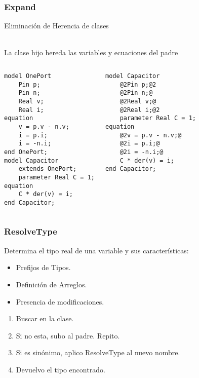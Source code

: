 \begin{frame}[fragile]
\frametitle{Expand} 
\begin{huge}
Eliminación de Herencia de clases
\end{huge} \\
La clase hijo hereda las variables y ecuaciones del padre
 
\pause 
\begin{columns} 
\begin{lstlisting}[style=base,basicstyle=\scriptsize]
model OnePort
    Pin p;
    Pin n;
    Real v;
    Real i;
equation
    v = p.v - n.v;
    i = p.i;
    i = -n.i;
end OnePort;
model Capacitor
    extends OnePort;
    parameter Real C = 1;
equation
    C * der(v) = i;
end Capacitor;
\end{lstlisting} 
\pause
{}  
\begin{lstlisting}[style=base,basicstyle=\scriptsize]
model Capacitor 
    @2Pin p;@2
    @2Pin n;@
    @2Real v;@
    @2Real i;@2
    parameter Real C = 1;
equation
    @2v = p.v - n.v;@
    @2i = p.i;@
    @2i = -n.i;@
    C * der(v) = i;
end Capacitor;
\end{lstlisting}
\end{columns}
\end{frame}



\begin{frame}[fragile]
\frametitle{ResolveType} 
Determina el tipo real de una variable y sus características: 
\begin{itemize}
    \item Prefijos de Tipos.
    \item Definición de Arreglos. 
    \item Presencia de modificaciones.
\end{itemize}

\begin{enumerate}
\item Buscar en la clase.
\item Si no esta, subo al padre. Repito.
\item Si es sinónimo, aplico ResolveType al nuevo nombre.
\item Devuelvo el tipo encontrado.
\end{enumerate}
\end{frame}

